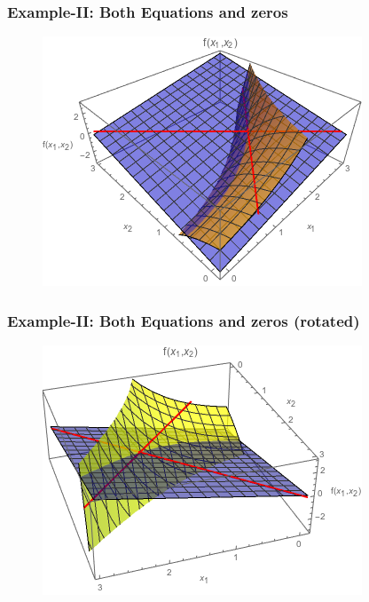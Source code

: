\documentclass{beamer}
\begin{document}
\begin{frame}
\frametitle[alignment=center]{Example-II: Both Equations and zeros}
\begin{figure}[htdb!]
\centering
\includegraphics[scale=0.7]{NewtonsMethod_2d_3.png}
\end{figure}
\end{frame}

\begin{frame}
\frametitle[alignment=center]{Example-II: Both Equations and zeros (rotated)}
\begin{figure}[htdb!]
\centering
\includegraphics[scale=0.7]{NewtonsMethod_2d_4.png}
\end{figure}
\end{frame}
\end{document}
